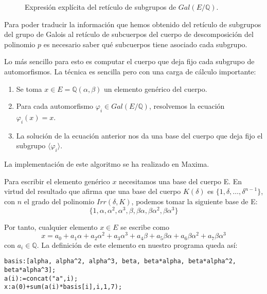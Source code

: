 \documentclass[a4paper, 11pt]{article}
\begin{document}
\begin{solucion}
\begin{figure}[ht!]
          \caption{Expresión explícita del retículo de subgrupos de $Gal(E/\mathbb{Q})$.}
          \label{retFinal}
      \end{figure}

      Para poder traducir la información que hemos obtenido del retículo de subgrupos del grupo de Galois al retículo de subcuerpos del cuerpo de descomposición del polinomio $p$ es necesario saber qué subcuerpos tiene asociado cada subgrupo.

      Lo más sencillo para esto es computar el cuerpo que deja fijo cada subgrupo de automorfismos. La técnica es sencilla pero con una carga de cálculo importante:
      \begin{enumerate}
          \item Se toma $x \in E=\mathbb{Q}(\alpha,\beta)$ un elemento genérico del cuerpo.
          \item Para cada automorfismo $\varphi_i \in Gal(E/\mathbb{Q})$, resolvemos la ecuación $\varphi_i(x) = x$.
          \item La solución de la ecuación anterior nos da una base del cuerpo que deja fijo el subgrupo $\langle\varphi_i\rangle$.
      \end{enumerate}

      La implementación de este algoritmo se ha realizado en Maxima.

      Para escribir el elemento genérico $x$ necesitamos una base del cuerpo E. En virtud del resultado que afirma que una base del cuerpo $K(\delta)$ es $\{1,\delta,\dots,\delta^{n-1}\}$, con $n$ el grado del polinomio $Irr(\delta,K)$, podemos tomar la siguiente base de E:
      \[
      \{1,\alpha,\alpha^2,\alpha^3,\beta,\beta\alpha,\beta\alpha^2,\beta\alpha^3\}
      \]

      Por tanto, cualquier elemento $x \in E$ se escribe como
      \[
      x = a_0 + a_1\alpha + a_2\alpha^2 + a_3\alpha^3 + a_4\beta + a_5\beta\alpha + a_6\beta\alpha^2 + a_7\beta\alpha^3
      \]
      con $a_i\in\mathbb{Q}$. La definición de este elemento en nuestro programa queda así:

      \color{blue}
      \begin{verbatim}
basis:[alpha, alpha^2, alpha^3, beta, beta*alpha, beta*alpha^2, beta*alpha^3];
a(i):=concat("a",i);
x:a(0)+sum(a(i)*basis[i],i,1,7);
      \end{verbatim}
      \color{black}


\end{solucion}
\end{document}
